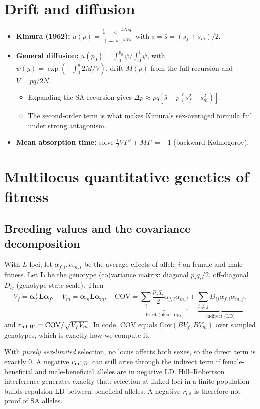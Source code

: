 \section{Drift and diffusion}
\begin{itemize}
\item \textbf{Kimura (1962):} $u(p)=\dfrac{1-e^{-4Nsp}}{1-e^{-4Ns}}$ with $s=\bar s=(s_f+s_m)/2$.
\item \textbf{General diffusion:} $u(p_0)=\int_0^{p_0}\psi\big/\int_0^1\psi$, with $\psi(y)=\exp(-\int_0^y 2M/V)$, drift $M(p)$ from the full recursion and $V=pq/2N$.
  \begin{itemize}
  \item Expanding the SA recursion gives $\Delta p\approx pq[\bar s-p(s_f^2+s_m^2)]$.
  \item The second-order term is what makes Kimura's sex-averaged formula fail under strong antagonism.
  \end{itemize}
\item \textbf{Mean absorption time:} solve $\tfrac12 VT''+MT'=-1$ (backward Kolmogorov).
\end{itemize}

\section{Multilocus quantitative genetics of fitness}\label{sec:robertson}
\subsection{Breeding values and the covariance decomposition}
With $L$ loci, let $\alpha_{f,i},\alpha_{m,i}$ be the average effects of allele $i$ on female and male fitness. Let $\mathbf{L}$ be the genotype (co)variance matrix: diagonal $p_iq_i/2$, off-diagonal $D_{ij}$ (genotype-state scale). Then
\begin{equation}
V_f=\boldsymbol\alpha_f^\top\mathbf L\boldsymbol\alpha_f,\quad V_m=\boldsymbol\alpha_m^\top\mathbf L\boldsymbol\alpha_m,\quad
\mathrm{COV}=\underbrace{\sum_i \frac{p_iq_i}{2}\alpha_{f,i}\alpha_{m,i}}_{\text{direct (pleiotropy)}}+\underbrace{\sum_{i\ne j}D_{ij}\alpha_{f,i}\alpha_{m,j}}_{\text{indirect (LD)}},
\end{equation}
and $r_{\mathrm{mf},W}=\mathrm{COV}/\sqrt{V_fV_m}$. In code, $\mathrm{COV}$ equals $\mathrm{Cov}(BV_f,BV_m)$ over sampled genotypes, which is exactly how we compute it.

\begin{keybox}
With \emph{purely sex-limited} selection, no locus affects both sexes, so the direct term is exactly 0. A negative $r_{\mathrm{mf},W}$ can still arise through the indirect term if female-beneficial and male-beneficial alleles are in negative LD. Hill--Robertson interference generates exactly that: selection at linked loci in a finite population builds repulsion LD between beneficial alleles. A negative $r_{\mathrm{mf}}$ is therefore not proof of SA alleles.
\end{keybox}

